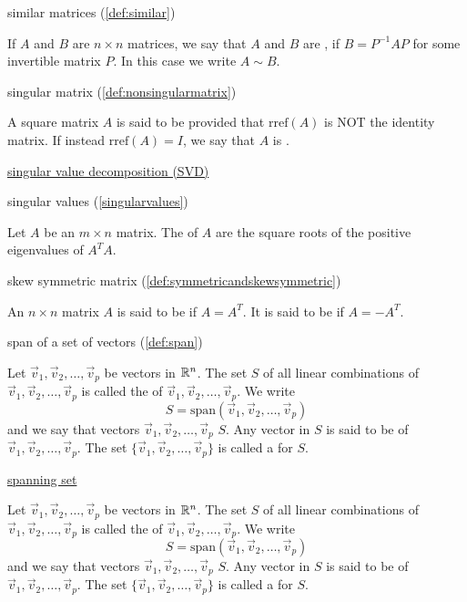\documentclass{ximera}
\begin{document}
similar matrices (\ref{def:similar})
\begin{expandable}
    If $A$ and $B$ are $n \times n$ matrices, we say that $A$ and $B$ are , if $B = P^{-1}AP$ for some invertible matrix $P$.  In this case we write $A \sim B$.
\end{expandable}

singular matrix (\ref{def:nonsingularmatrix})
\begin{expandable}
    A square matrix $A$ is said to be  provided that $\mbox{rref}(A)$ is NOT the identity matrix.  If instead $\mbox{rref}(A)=I$, we say that $A$ is .
\end{expandable}

\href{https://ximera.osu.edu/oerlinalg/LinearAlgebra/RTH-0060/main}{singular value decomposition (SVD)}

singular values (\ref{singularvalues})
\begin{expandable}
    Let $A$ be an $m\times n$ matrix. The  of $A$ are the square roots of the positive
eigenvalues of $A^TA.$ 
\end{expandable}

skew symmetric matrix (\ref{def:symmetricandskewsymmetric})
\begin{expandable}
    An $n\times n$ matrix $A$ is said to be
 if $A=A^{T}.$ It is said to be
 if $A=-A^{T}.$
\end{expandable}


span of a set of vectors (\ref{def:span})
\begin{expandable}
    Let $\vec{v}_1, \vec{v}_2,\ldots ,\vec{v}_p$ be vectors in $\mathbb{R}^n$.  The set $S$ of all linear combinations of $\vec{v}_1, \vec{v}_2,\ldots ,\vec{v}_p$ is called the  of $\vec{v}_1, \vec{v}_2,\ldots ,\vec{v}_p$.  We write 
$$S=\mbox{span}(\vec{v}_1, \vec{v}_2,\ldots ,\vec{v}_p)$$
and we say that vectors $\vec{v}_1, \vec{v}_2,\ldots ,\vec{v}_p$  $S$.  Any vector in $S$ is said to be  of $\vec{v}_1, \vec{v}_2,\ldots ,\vec{v}_p$.  The set $\{\vec{v}_1, \vec{v}_2,\ldots ,\vec{v}_p\}$ is called a  for $S$.
\end{expandable}

\href{https://ximera.osu.edu/oerlinalg/LinearAlgebra/VEC-0090/main}{spanning set}
\begin{expandable}
    Let $\vec{v}_1, \vec{v}_2,\ldots ,\vec{v}_p$ be vectors in $\mathbb{R}^n$.  The set $S$ of all linear combinations of $\vec{v}_1, \vec{v}_2,\ldots ,\vec{v}_p$ is called the  of $\vec{v}_1, \vec{v}_2,\ldots ,\vec{v}_p$.  We write 
$$S=\mbox{span}(\vec{v}_1, \vec{v}_2,\ldots ,\vec{v}_p)$$
and we say that vectors $\vec{v}_1, \vec{v}_2,\ldots ,\vec{v}_p$  $S$.  Any vector in $S$ is said to be  of $\vec{v}_1, \vec{v}_2,\ldots ,\vec{v}_p$.  The set $\{\vec{v}_1, \vec{v}_2,\ldots ,\vec{v}_p\}$ is called a  for $S$.
\end{expandable}
\end{document}
